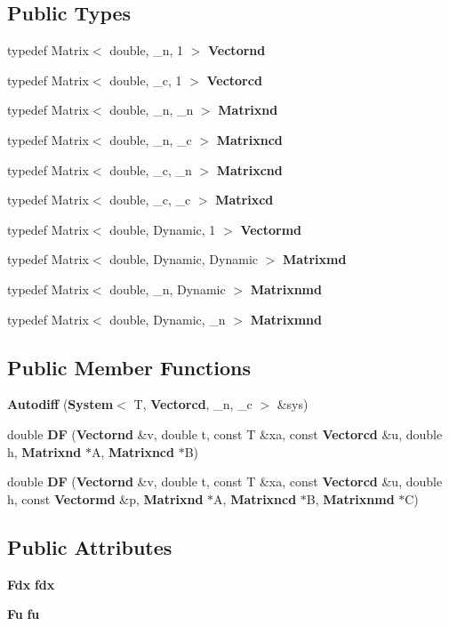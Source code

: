 \subsection*{\-Public \-Types}
\begin{DoxyCompactItemize}
\item 
typedef \-Matrix$<$ double, \-\_\-n, 1 $>$ {\bf \-Vectornd}
\item 
typedef \-Matrix$<$ double, \-\_\-c, 1 $>$ {\bf \-Vectorcd}
\item 
typedef \-Matrix$<$ double, \-\_\-n, \-\_\-n $>$ {\bf \-Matrixnd}
\item 
typedef \-Matrix$<$ double, \-\_\-n, \-\_\-c $>$ {\bf \-Matrixncd}
\item 
typedef \-Matrix$<$ double, \-\_\-c, \-\_\-n $>$ {\bf \-Matrixcnd}
\item 
typedef \-Matrix$<$ double, \-\_\-c, \-\_\-c $>$ {\bf \-Matrixcd}
\item 
typedef \-Matrix$<$ double, \*
\-Dynamic, 1 $>$ {\bf \-Vectormd}
\item 
typedef \-Matrix$<$ double, \*
\-Dynamic, \-Dynamic $>$ {\bf \-Matrixmd}
\item 
typedef \-Matrix$<$ double, \-\_\-n, \*
\-Dynamic $>$ {\bf \-Matrixnmd}
\item 
typedef \-Matrix$<$ double, \*
\-Dynamic, \-\_\-n $>$ {\bf \-Matrixmnd}
\end{DoxyCompactItemize}
\subsection*{\-Public \-Member \-Functions}
\begin{DoxyCompactItemize}
\item 
{\bf \-Autodiff} ({\bf \-System}$<$ \-T, {\bf \-Vectorcd}, \-\_\-n, \-\_\-c $>$ \&sys)
\item 
double {\bf \-D\-F} ({\bf \-Vectornd} \&v, double t, const \-T \&xa, const {\bf \-Vectorcd} \&u, double h, {\bf \-Matrixnd} $\ast$\-A, {\bf \-Matrixncd} $\ast$\-B)
\item 
double {\bf \-D\-F} ({\bf \-Vectornd} \&v, double t, const \-T \&xa, const {\bf \-Vectorcd} \&u, double h, const {\bf \-Vectormd} \&p, {\bf \-Matrixnd} $\ast$\-A, {\bf \-Matrixncd} $\ast$\-B, {\bf \-Matrixnmd} $\ast$\-C)
\end{DoxyCompactItemize}
\subsection*{\-Public \-Attributes}
\begin{DoxyCompactItemize}
\item 
{\bf \-Fdx} {\bf fdx}
\item 
{\bf \-Fu} {\bf fu}
\end{DoxyCompactItemize}
